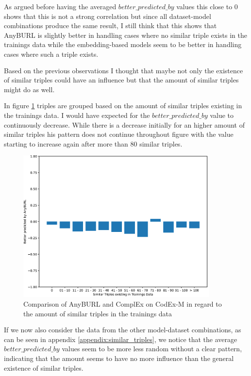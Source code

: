 As argued before having the averaged $better\_predicted\_by$ values this close to $0$ shows that this is not a strong correlation but since all dataset-model combinations produce the same result, I still think that this shows that AnyBURL is slightly better in handling cases where no similar triple exists in the trainings data while the embedding-based models seem to be better in handling cases where such a triple exists.

Based on the previous observations I thought that maybe not only the existence of similar triples could have an influence but that the amount of similar triples might do as well. 

In figure \ref{fig:similar_triples_steps_anyburl_complex_codex} triples are grouped based on the amount of similar triples existing in the trainings data. I would have expected for the $better\_predicted\_by$ value to continuously decrease. While there is a decrease initially for an higher amount of similar triples his pattern does not continue throughout figure with the value starting to increase again after more than $80$ similar triples. 

\begin{figure}[H]
\centering
\includegraphics[width=0.9\textwidth]{images/similar_triples_steps_anyburl_complex_codex.PNG}
\caption{Comparison of AnyBURL and ComplEx on CodEx-M in regard to the amount of similar triples in the trainings data}
\label{fig:similar_triples_steps_anyburl_complex_codex}
\end{figure}

If we now also consider the data from the other model-dataset combinations, as can be seen in appendix \ref{appendix:similar_triples}, we notice that the average $better\_predicted\_by$ values seem to be more less random without a clear pattern, indicating that the amount seems to have no more influence than the general existence of similar triples.

